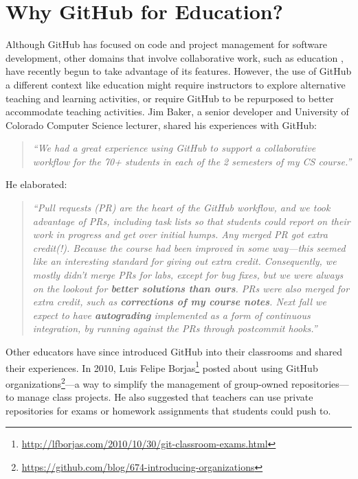 \section{Why GitHub for Education?}
Although GitHub has focused on code and project management for software development, other domains that involve collaborative work, such as education \cite{griffin2013github}, have recently begun to take advantage of its features. However, the use of GitHub a different context like education might require instructors to explore alternative teaching and learning activities, or require GitHub to be repurposed to better accommodate teaching activities. Jim Baker, a senior developer and University of Colorado Computer Science lecturer, shared his experiences with GitHub: \begin{quote}\textit{``We had a great experience using GitHub to support a collaborative workflow for the 70+ students in each of the 2 semesters of my CS course.''}\end{quote} He elaborated: \begin{quote}\textit{``Pull requests (PR) are the heart of the GitHub workflow, and we took advantage of PRs, including task lists so that students could report on their work in progress and get over initial humps. Any merged PR got extra credit(!). Because the course had been improved in some way---this seemed like an interesting standard for giving out extra credit. Consequently, we mostly didn't merge PRs for labs, except for bug fixes, but we were always on the lookout for \textbf{better solutions than ours}. PRs were also merged for extra credit, such as \textbf{corrections of my course notes}. Next fall we expect to have \textbf{autograding} implemented as a form of continuous integration, by running against the PRs through postcommit hooks.''}\end{quote}

Other educators have since introduced GitHub into their classrooms and shared their experiences. In 2010, Luis Felipe Borjas\footnote{\url{http://lfborjas.com/2010/10/30/git-classroom-exams.html}} posted about using GitHub organizations\footnote{\url{https://github.com/blog/674-introducing-organizations}}---a way to simplify the management of group-owned repositories---to manage class projects. He also suggested that teachers can use private repositories for exams or homework assignments that students could push to.

